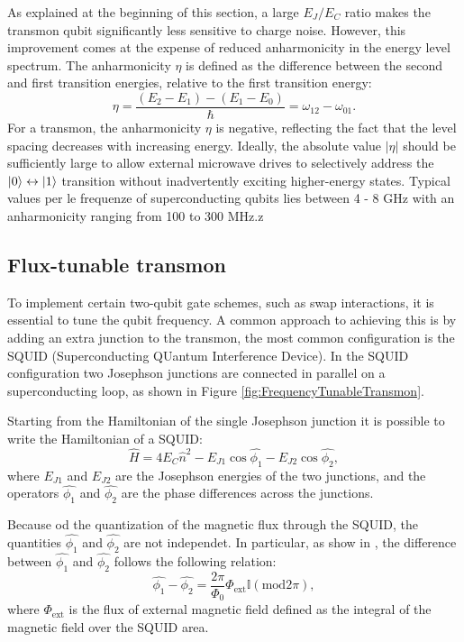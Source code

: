 As explained at the beginning of this section, a large $E_J/E_C$ ratio makes the transmon qubit significantly less sensitive to charge noise. 
However, this improvement comes at the expense of reduced anharmonicity in the energy level spectrum. 
The anharmonicity $\eta$ is defined as the difference between the second and first transition energies, relative to the first transition energy:
\begin{equation}
    \eta = \frac{(E_2 - E_1) - (E_1 - E_0)}{\hbar} = \omega_{12} - \omega_{01}.
\end{equation}
For a transmon, the anharmonicity $\eta$ is negative, reflecting the fact that the level spacing decreases with increasing energy. 
Ideally, the absolute value  $|\eta|$ should be sufficiently large to allow external microwave drives to selectively address the $\ket{0}\leftrightarrow\ket{1}$ transition without inadvertently exciting higher-energy states.
Typical values per le frequenze of superconducting qubits lies between 4 - 8 GHz with an anharmonicity ranging from 100 to 300 MHz.z

\subsection{Flux-tunable transmon}\label{subsec:flux_tunable_transmon}
To implement certain two-qubit gate schemes, such as swap interactions, it is essential to tune the qubit frequency. 
A common approach to achieving this is by adding an extra junction to the transmon, the most common configuration is the SQUID (Superconducting QUantum Interference Device).
In the SQUID configuration two Josephson junctions are connected in parallel on a superconducting loop, as shown in Figure \ref{fig:FrequencyTunableTransmon}.

Starting from the Hamiltonian of the single Josephson junction it is possible to write the Hamiltonian of a SQUID:
\begin{equation}\label{eq:SQUID_Hamiltonian}
    \hat{H} = 4E_C\hat{n}^2 - E_{J1}\cos{\hat{\phi_1}} - E_{J2}\cos{\hat{\phi_2}},
\end{equation}
where $E_{J1}$ and $E_{J2}$ are the Josephson energies of the two junctions, and the operators $\hat{\phi_1}$ and $\hat{\phi_2}$ are the phase differences across the junctions.

Because od the quantization of the magnetic flux through the SQUID, the quantities $\hat{\phi_1}$ and $\hat{\phi_2}$ are not independet. 
In particular, as show in \cite{manenti_quantum_2023}, the difference between $\hat{\phi_1}$ and $\hat{\phi_2}$ follows the following relation:
\begin{equation}\label{eq:phases_relation}
    \hat{\phi_1} - \hat{\phi_2} = \frac{2\pi}{\Phi_0}\Phi_{\text{ext}}\mathbb{I}(\text{mod}2\pi),
\end{equation}
where $\Phi_{\text{ext}}$ is the flux of external magnetic field defined as the integral of the magnetic field over the SQUID area.

